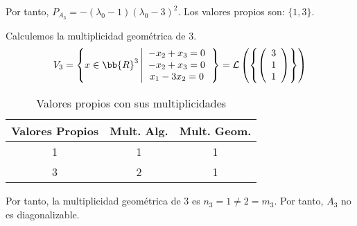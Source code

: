 \begin{ejercicio}
\begin{enumerate}
\begin{enumerate}
            \begin{figure}[H]
                \centering
            \end{figure}

            Por tanto, $P_{A_3}  = -(\lambda_0-1)(\lambda_0-3)^2$. Los valores propios son: $\{1, 3\}$.

            Calculemos la multiplicidad geométrica de $3$.
            \begin{equation*}
            V_3 = \left\{x\in\bb{R}^3 \left| \begin{array}{c}
                 -x_2+x_3=0  \\
                 -x_2+x_3 = 0 \\
                 x_1-3x_2 = 0
            \end{array}\right.\right\} = \mathcal{L}\left(\left\{ \left(\begin{array}{c}
                    3 \\
                    1 \\
                    1 \\
               \end{array}\right)
               \right\}\right)
            \end{equation*}
            \begin{table}[H]
                \centering
                \begin{tabular}{c|c|c}
                    Valores Propios & Mult. Alg. & Mult. Geom. \\ \hline 
                    1 & 1 & 1\\
                    3 & 2 & 1\\
                \end{tabular}
                \caption{Valores propios con sus multiplicidades}
            \end{table}

            Por tanto, la multiplicidad geométrica de $3$ es $n_3=1 \neq 2 = m_3$. Por tanto, $A_3$ no es diagonalizable.


\end{enumerate}
\end{enumerate}
\end{ejercicio}
